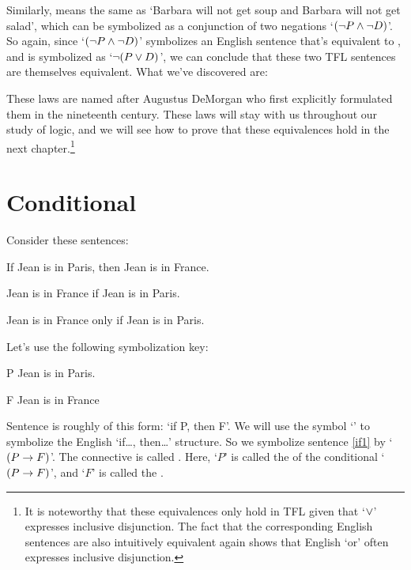Similarly,  means the same as `Barbara will not get soup and Barbara will not get salad', which can be symbolized as a conjunction of two negations `$(\neg P \wedge \neg D)$'.  So again, since `$(\neg P \wedge \neg D)$' symbolizes an English sentence that's equivalent to , and  is symbolized as `$\neg (P \vee D)$', we can conclude that these two TFL sentences are themselves equivalent.  What we've discovered are:


\noindent These  laws are named after Augustus DeMorgan who first explicitly formulated them in the nineteenth century.  These laws will stay with us throughout our study of logic, and we will see how to prove that these equivalences hold in the next chapter.\footnote{It is noteworthy that these equivalences only hold in TFL given that `$\vee$' expresses inclusive disjunction.  The fact that the corresponding English sentences are also intuitively equivalent again shows that English `or' often expresses inclusive disjunction.}


\section{Conditional}
Consider these sentences:
	\begin{earg}
		\item[\ex{if0}] If Jean is in Paris, then Jean is in France.
		\item[\ex{if1}] Jean is in France if Jean is in Paris.
		\item[\ex{if2}] Jean is in France only if Jean is in Paris.
	\end{earg}
Let's use the following symbolization key:
	\begin{ekey}
		\item[P] Jean is in Paris.
		\item[F] Jean is in France
	\end{ekey}
Sentence  is roughly of this form: `if P, then F'. We will use the symbol `\eif' to symbolize the English `if\ldots, then\ldots' structure. So we symbolize sentence \ref{if1} by `$(P\rightarrow F)$'. The connective is called . Here, `$P$' is called the  of the conditional `$(P \rightarrow F)$', and `$F$' is called the .

